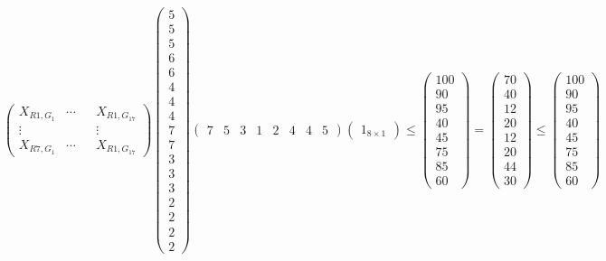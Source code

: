 \begin{equation}
    \begin{pmatrix}
        X_{R1,G_1} & \cdots & & X_{R1,G_{17}}\\
        \vdots & & & \vdots\\
        X_{R7,G_1} & \cdots & & X_{R1,G_{17}}
    \end{pmatrix}
    \begin{pmatrix}
        5\\
        5\\
        5\\
        6\\
        6\\
        4\\
        4\\
        4\\
        7\\
        7\\
        3\\
        3\\
        3\\
        2\\
        2\\
        2\\
        2
    \end{pmatrix}
    \begin{pmatrix}
        7 & 5 & 3 & 1 & 2 & 4 & 4 & 5
    \end{pmatrix}
    \begin{pmatrix}
        1_{8 \times 1}
    \end{pmatrix}
    \leq
    \begin{pmatrix}
        100\\
        90\\
        95\\
        40\\
        45\\
        75\\
        85\\
        60
    \end{pmatrix}
    =
    \begin{pmatrix}
        70\\
        40\\
        12\\
        20\\
        12\\
        20\\
        44\\
        30
    \end{pmatrix}
    \leq
    \begin{pmatrix}
        100\\
        90\\
        95\\
        40\\
        45\\
        75\\
        85\\
        60
    \end{pmatrix}
\end{equation}

